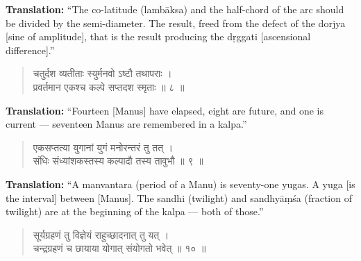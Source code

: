 \documentclass[11pt,a4paper]{article}
\newcommand{\dev}[1]{{\devanagarifont #1}}
\newenvironment{sanskritverse}{\begin{verse}\devanagarifont\large\centering}{\end{verse}}
\begin{document}
\vspace{0.3cm}
\noindent\textbf{Translation:} ``The co-latitude (lambāksa) and the half-chord of the arc should be divided by the semi-diameter. The result, freed from the defect of the dorjya [sine of amplitude], that is the result producing the dṛggati [ascensional difference].''

\vspace{0.5cm}

\begin{tcolorbox}[colback=white,colframe=rulecolor,title={\dev{\textbf{कालक्रिया ८ — युगपादसन्धिः}}}]
\begin{sanskritverse}
\dev{चतुर्दश व्यतीताः स्युर्मनवो ऽष्टौ तथापराः ।\\
प्रवर्तमान एकश्च कल्पे सप्तदश स्मृताः ॥ ८ ॥}
\end{sanskritverse}
\end{tcolorbox}

\vspace{0.3cm}
\noindent\textbf{Translation:} ``Fourteen [Manus] have elapsed, eight are future, and one is current --- seventeen Manus are remembered in a kalpa.''

\vspace{0.5cm}

\begin{tcolorbox}[colback=white,colframe=rulecolor,title={\dev{\textbf{कालक्रिया ९ — मनुसंख्या}}}]
\begin{sanskritverse}
\dev{एकसप्तत्या युगानां युगं मनोरन्तरं तु तत् ।\\
संधिः संध्यांशकस्तस्य कल्पादौ तस्य तावुभौ ॥ ९ ॥}
\end{sanskritverse}
\end{tcolorbox}

\vspace{0.3cm}
\noindent\textbf{Translation:} ``A manvantara (period of a Manu) is seventy-one yugas. A yuga [is the interval] between [Manus]. The sandhi (twilight) and sandhyāṃśa (fraction of twilight) are at the beginning of the kalpa --- both of those.''

\vspace{0.5cm}

\begin{tcolorbox}[colback=white,colframe=rulecolor,title={\dev{\textbf{कालक्रिया १० — ग्रहणनिर्णयः (Eclipse Determination)}}}]
\begin{sanskritverse}
\dev{सूर्यग्रहणं तु विज्ञेयं राहुच्छादनात् तु यत् ।\\
चन्द्रग्रहणं च छायाया योगात् संयोगतो भवेत् ॥ १० ॥}
\end{sanskritverse}
\end{tcolorbox}
\end{document}
